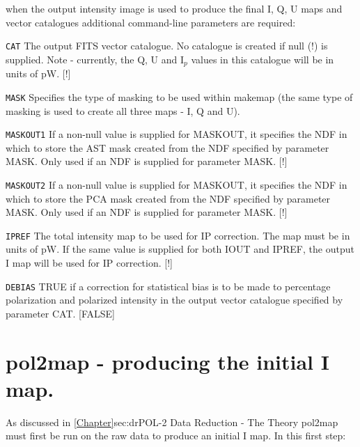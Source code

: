 when the output intensity image is used to produce the final I, Q, U
maps and vector catalogues additional command-line parameters are
required:

\begin{aligndesc}

\item[\texttt{CAT}] The output FITS vector catalogue. No catalogue is
  created if null (!) is supplied. Note - currently, the Q, U and
  I$_{p}$ values in this catalogue will be in units of pW. [!]


\item[\texttt{MASK}] Specifies the type of masking to be used within
  makemap (the same type of masking is used to create all three maps -
  I, Q and U).


\item[\texttt{MASKOUT1}] If a non-null value is supplied for MASKOUT,
  it specifies the NDF in which to store the AST mask created from the
  NDF specified by parameter MASK. Only used if an NDF is supplied for
  parameter MASK. [!]


\item[\texttt{MASKOUT2}] If a non-null value is supplied for MASKOUT,
  it specifies the NDF in which to store the PCA mask created from the
  NDF specified by parameter MASK. Only used if an NDF is supplied for
  parameter MASK. [!]


\item[\texttt{IPREF}] The total intensity map to be used for IP
  correction. The map must be in units of pW. If the same value is
  supplied for both IOUT and IPREF, the output I map will be used for
  IP correction. [!]

\item[\texttt{DEBIAS}] TRUE if a correction for statistical bias is to
  be made to percentage polarization and polarized intensity in the
  output vector catalogue specified by parameter CAT. [FALSE]
\end{aligndesc}



\section{pol2map - producing the initial I map.}

As discussed in \cref{Chapter}{sec:dr}{POL-2 Data Reduction - The
  Theory} pol2map must first be run on the raw data to produce an
initial I map.  In this first step:

\begin{terminalv}
\end{terminalv}


